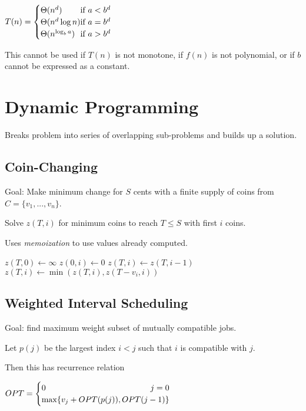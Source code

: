 $T(n) = \begin{cases} \Theta(n^d) \hfill \text{if } a < b^d \\
\Theta(n^d\log{n}) \hfill \text{if } a = b^d \\
\Theta(n^{\log_b{a}}) \hfill \text{if } a > b^d
\end{cases}$

This cannot be used if $T(n)$ is not monotone, if $f(n)$ is not polynomial, or if $b$ cannot be expressed as a constant. 

\section*{Dynamic Programming}
Breaks problem into series of overlapping sub-problems and builds up a solution.

\subsection*{Coin-Changing}
Goal: Make minimum change for $S$ cents with a finite supply of coins from $C = \{v_1,...,v_n\}$. 

Solve $z(T,i)$ for minimum coins to reach $T \leq S$ with first $i$ coins. 

Uses \textit{memoization} to use values already computed. 

\begin{algorithm}[H]
\begin{algorithmic}[1]
 $z(T,0) \gets \infty$
\EndFor
{} $z(0,i) \gets 0$
\EndFor
{}
\State $z(T,i) \gets z(T,i-1)$
\State $z(T,i) \gets \min (z(T,i), z(T-v_i,i))$
\EndIf
\EndFor
\EndFor
\EndProcedure
\end{algorithmic}
\end{algorithm}

\subsection*{Weighted Interval Scheduling}
Goal: find maximum weight subset of mutually compatible jobs.

Let $p(j)$ be the largest index $i < j$ such that $i$ is compatible with $j$. 

Then this has recurrence relation

$OPT = \begin{cases}
 0 \hfill j = 0 \\
 \max \{ v_j + OPT(p(j)), OPT(j-1)\}
 \end{cases}$
 
